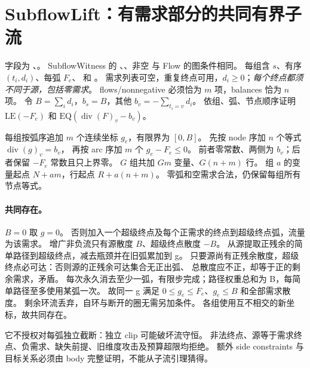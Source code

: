 \section{SubflowLift：有需求部分的共同有界子流}
\label{ins:subflow-lift}

字段为 、。
SubflowWitness 的 、、非空  与 Flow 的图条件相同。
每组含  $s$、有序  $(t_i,d_i)$、每弧  $F_e$、
 和 。
需求列表可空，重复终点可用，$d_i\ge0$；\emph{每个终点都须不同于源，包括零需求}。
flows/nonnegative 必须恰为 $m$ 项，balances 恰为 $n$ 项。
令 $B=\sum_i d_i$，$b_s=B$，其他 $b_v=-\sum_{t_i=v}d_i$。
依组、弧、节点顺序证明 $\mathrm{LE}(-F_e)$ 和
$\mathrm{EQ}(\operatorname{div}(F)_v-b_v)$。

每组按弧序追加 $m$ 个连续坐标 $g_e$，有限界为 $[0,B]$。
先按 node 序加 $n$ 个等式 $\operatorname{div}(g)_v=b_v$，
再按 arc 序加 $m$ 个 $g_e-F_e\le0$。
前者零常数、两侧为 $b_v$；后者保留 $-F_e$ 常数且只上界零。
$G$ 组共加 $Gm$ 变量、$G(n+m)$ 行。
组 $a$ 的变量起点 $N+am$，行起点 $R+a(n+m)$。
零弧和空需求合法，仍保留每组所有节点等式。

\paragraph{共同存在。}$B=0$ 取 $g=0$。
否则加入一个超级终点及每个正需求的终点到超级终点弧，流量为该需求。
增广非负流只有源散度 $B$、超级终点散度 $-B$。
从源提取正残余的简单路径到超级终点，减去瓶颈并在旧弧累加到 g。
只要源尚有正残余散度，超级终点必可达：否则源的正残余可达集合无正出弧、
总散度应不正，却等于正的剩余需求，矛盾。
每次永久消去至少一弧，有限步完成；路径权重总和为 B，每简单路径至多使用某弧一次。
故同一 g 满足 $0\le g_e\le F_e$、$g_e\le B$ 和全部需求散度。
剩余环流丢弃，自环与断开的圈无需另加条件。
各组使用互不相交的新坐标，故共同存在。

它不授权对每弧独立截断：独立 clip 可能破坏流守恒。
非法终点、源等于需求终点、负需求、缺失前提、旧维度攻击及预算超限均拒绝。
额外 side constraints 与目标关系必须由 body 完整证明，不能从子流引理猜得。
